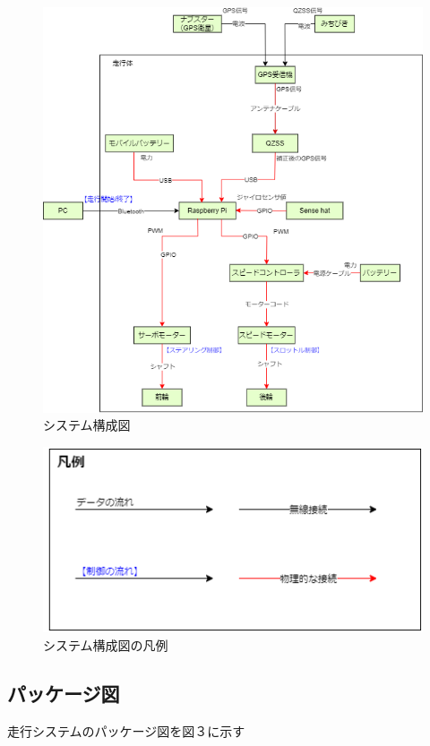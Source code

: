 \documentclass[submit,techrep,noauthor]{ipsj}
\begin{document}
\begin{figure}[h]
 \centering
   \includegraphics[scale=0.38]{Sys.png}
 \caption{システム構成図}
 \label{システム構成図}
\end{figure}

\begin{figure}[h]
 \centering
   \includegraphics[scale=0.25]{hanrei.png}
   \caption{システム構成図の凡例}
 \label{システム構成図の凡例}
\end{figure}



\newpage

\subsection{パッケージ図}
走行システムのパッケージ図を図３に示す
\end{document}
